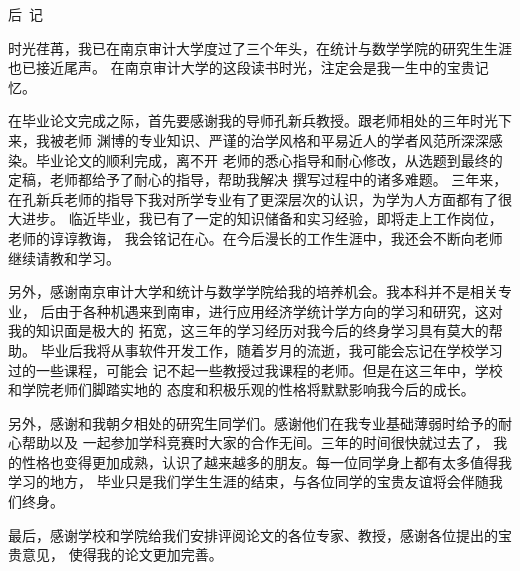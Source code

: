 \centerline{\large\heiti 后\ 记}

\vspace{2ex}

时光荏苒，我已在南京审计大学度过了三个年头，在统计与数学学院的研究生生涯也已接近尾声。
在南京审计大学的这段读书时光，注定会是我一生中的宝贵记忆。

在毕业论文完成之际，首先要感谢我的导师孔新兵教授。跟老师相处的三年时光下来，我被老师
渊博的专业知识、严谨的治学风格和平易近人的学者风范所深深感染。毕业论文的顺利完成，离不开
老师的悉心指导和耐心修改，从选题到最终的定稿，老师都给予了耐心的指导，帮助我解决
撰写过程中的诸多难题。
三年来，在孔新兵老师的指导下我对所学专业有了更深层次的认识，为学为人方面都有了很大进步。
临近毕业，我已有了一定的知识储备和实习经验，即将走上工作岗位，老师的谆谆教诲，
我会铭记在心。在今后漫长的工作生涯中，我还会不断向老师继续请教和学习。

另外，感谢南京审计大学和统计与数学学院给我的培养机会。我本科并不是相关专业，
后由于各种机遇来到南审，进行应用经济学统计学方向的学习和研究，这对我的知识面是极大的
拓宽，这三年的学习经历对我今后的终身学习具有莫大的帮助。
毕业后我将从事软件开发工作，随着岁月的流逝，我可能会忘记在学校学习过的一些课程，可能会
记不起一些教授过我课程的老师。但是在这三年中，学校和学院老师们脚踏实地的
态度和积极乐观的性格将默默影响我今后的成长。

另外，感谢和我朝夕相处的研究生同学们。感谢他们在我专业基础薄弱时给予的耐心帮助以及
一起参加学科竞赛时大家的合作无间。三年的时间很快就过去了，
我的性格也变得更加成熟，认识了越来越多的朋友。每一位同学身上都有太多值得我学习的地方，
毕业只是我们学生生涯的结束，与各位同学的宝贵友谊将会伴随我们终身。

最后，感谢学校和学院给我们安排评阅论文的各位专家、教授，感谢各位提出的宝贵意见，
使得我的论文更加完善。
\vspace{2ex}

\thispagestyle{plain}

\vspace{1ex}
